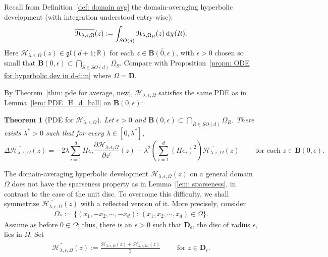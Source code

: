 \documentclass[11pt,a4paper,english,reqno]{amsart}
\theoremstyle{plain}
\newtheorem{theorem}[definition]{Theorem}
\newcommand{\R}{\mathbb{R}}
\newcommand{\dd}{{\rm d}}
\newcommand{\e}{\epsilon}
\newcommand{\1}{\mathbbm{1}}
\begin{document}
Recall from Definition~\ref{def: domain avg} the domain-averaging hyperbolic development (with integration understood entry-wise):
\begin{align*}
\overline{\mathcal{H}_{\lambda,\e,\Omega}}(z):= \int_{SO(d)} \mathcal{H}_{\lambda,\Omega_R}(z)\,\dd\chi(R).
\end{align*}
Here $
\overline{\mathcal{H}_{\lambda,\e,\Omega}}(z) \in \mathfrak{gl}(d+1;\R)$ for each $z \in \overline{\mathbf{B}(0,\e)}$, with $\e>0$ chosen so small that $\mathbf{B}(0,\e) \subset \bigcap_{S \in SO(d)} \Omega_S$. Compare with Proposition~\ref{propn: ODE for hyperbolic dev in d-dim} where $\Omega = \mathbf{D}$.


By Theorem~\ref{thm: pde for average, new}, $\overline{\mathcal{H}_{\lambda,\e,\Omega}}$ satisfies the same PDE as in Lemma~\ref{lem: PDE_H_d_ball} on $\mathbf{B}(0,\e)$:
\begin{theorem}[PDE for $\overline{\mathcal{H}_{\lambda,\e,\Omega}}$]\label{Thm:PDE_general_domain_hyperbolic_development} Let $\e >0$ and $\mathbf{B}(0,\e) \subset \bigcap_{R \in SO(d)} \Omega_R$. There exists $\lambda^* >0$ such that for every $\lambda \in [0, \lambda^*]$, 
\begin{equation*}
\Delta \overline{\mathcal{H}_{\lambda,\e, \Omega}}(z)=-2\lambda\sum_{i=1}^{d}He_{i}\frac{\partial \overline{\mathcal{H}_{\lambda,\e,\Omega}}}{\partial z^{i}}(z)-\lambda^{2}\left(\sum_{i=1}^{d}\left(He_{i}\right)^{2}\right)\overline{\mathcal{H}_{\lambda,\e,\Omega}}(z)\qquad \text{ for each } z \in \mathbf{B}(0,\e).
\end{equation*}
\end{theorem}


The domain-averaging hyperbolic development $\overline{\mathcal{H}_{\lambda,\e,\Omega}}(z)$ on a general domain $\Omega$ does not have the sparseness property as in Lemma~\ref{lem: sparseness}, in contrast to the case of the unit disc. To overcome this difficulty, we shall symmetrize $\overline{\mathcal{H}_{\lambda,\e,\Omega}}(z)$  with a reflected version of it. More precisely, consider
\begin{align*}
\Omega_\ast := \{(x_1,- x_{2}, \cdots, -x_{d}):\, (x_{1}, x_{2}, \cdots, x_{d}) \in \Omega\}.
\end{align*}
Assume as before $0 \in \Omega$; thus, there is an $\epsilon >0$ such that $\mathbf{D}_{\epsilon}$, the disc of radius $\e$, lies in $\Omega$. Set
\begin{eqnarray*}
\widetilde{\mathcal{H}_{\lambda,\e,\Omega}}(z):= \frac{\overline{\mathcal{H}_{\lambda,\e,\Omega}}(z) + \overline{\mathcal{H}_{\lambda,\e,\Omega_{\ast}}}(z)}{2}\qquad \text{ for } z \in \mathbf{D}_{\epsilon}.
\end{eqnarray*}
\end{document}
